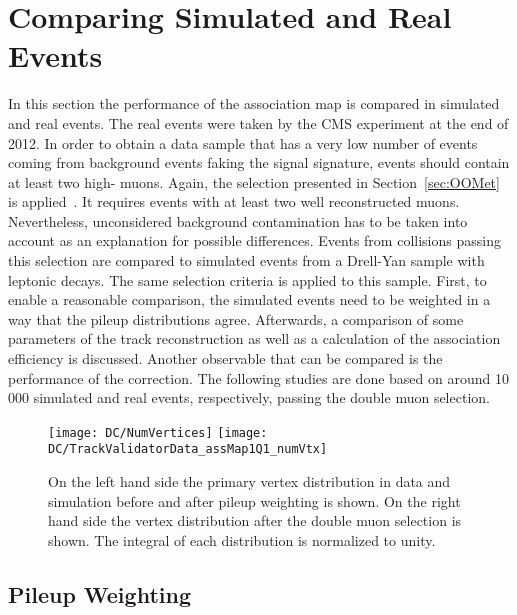 \chapter{Comparing Simulated and Real Events \label{sec:DC}}

In this section the performance of the association map is compared in simulated and real events. The real events were taken by the CMS experiment at the end of 2012. In order to obtain a data sample that has a very low number of events coming from background events faking the signal signature, events should contain at least two high-\pt{} muons. Again, the selection presented in Section~\ref{sec:OOMet} is applied~\cite{CMS-PAS-JME-12-002}. It requires events with at least two well reconstructed muons. Nevertheless, unconsidered background contamination has to be taken into account as an explanation for possible differences. Events from collisions passing this selection are compared to simulated events from a Drell-Yan sample with leptonic decays. The same selection criteria is applied to this sample.
First, to enable a reasonable comparison, the simulated events need to be weighted in a way that the pileup distributions agree. Afterwards, a comparison of some parameters of the track reconstruction as well as a calculation of the association efficiency is discussed. Another observable that can be compared is the performance of the \MET{} correction. The following studies are done based on around 10\,000 simulated and real events, respectively,  passing the double muon selection.

\begin{figure}[Hb]
    \centering
    \texttt{[image: DC/NumVertices]}
    \texttt{[image: DC/TrackValidatorData\_assMap1Q1\_numVtx]}
    \caption[Vertex distribution in data and simulation before and after pileup weighting and after double muon trigger]{On the left hand side the primary vertex distribution in data and simulation before and after pileup weighting is shown. On the right hand side the vertex distribution after the double muon selection is shown. The integral of each distribution is normalized to unity. \label{plot:DCPW}}
\end{figure}

\section{Pileup Weighting \label{sec:DCPW}}

